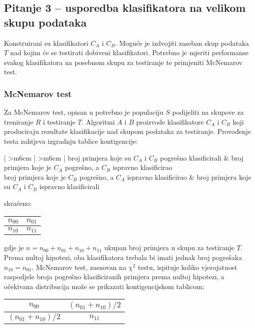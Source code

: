 \subsection{Pitanje 3 -- usporedba klasifikatora na velikom skupu podataka}
\label{subsec:pitanje3}

Konstruirani su klasifikatori $C_A$ i $C_B$. Moguće je izdvojiti zaseban skup podataka $T$ nad kojim će se testirati dobiveni klasifikatori. Potrebno je mjeriti performanse svakog klasifikatora na posebnom skupu za testiranje te primjeniti McNemarov test.

\subsubsection{McNemarov test}

Za McNemarov test, opisan u \citep{everitt1992analysis} potrebno je populaciju $S$ podijeliti na skupove za treniranje $R$ i testiranje $T$. Algoritmi $A$ i $B$ proizvode klasifikatore $C_A$ i $C_B$ koji produciraju rezultate klasifikacije nad skupom podataka za testiranje. Provođenje testa zahtjeva izgradnju tablice kontigencije:

\begin{table}[h]
\centering
\begin{tabular}{{| >{\centering\arraybackslash}m{6cm} | >{\centering\arraybackslash}m{6cm} |}}
\hline
broj primjera koje su $C_A$ i $C_B$ pogrešno klasificirali & broj primjera koje je $C_A$ pogrešno, a $C_B$ ispravno klasificirao \\ \hline
broj primjera koje je $C_B$ pogrešno, a $C_A$ ispravno klasificirao & broj primjera koje su $C_A$ i $C_B$ ispravno klasificirali \\
\hline
\end{tabular}
\end{table}
skraćeno:
\begin{table}[h]
\centering
\begin{tabular}{|c|c|}
\hline
$n_{00}$ & $n_{01}$ \\ \hline
$n_{10}$ & $n_{11}$ \\
\hline
\end{tabular}
\end{table}
gdje je $n = n_{00}+n_{01}+n_{10}+n_{11}$ ukupan broj primjera u skupu za testiranje $T$. Prema nultoj hipotezi, oba klasifikatora trebala bi imati jednak broj pogrešaka $n_{10}=n_{01}$. McNemarov test, zasnovan na $\chi^2$ testu, ispituje koliko vjerojatnost raspodjele broja pogrešno klasificiranih primjera prema nultoj hipotezi, a očekivana distribucija može se prikazati kontigencijskom tablicom:
\begin{table}[h]
\centering
\begin{tabular}{|c|c|}
\hline
$n_{00}$ & $(n_{01} + n_{10})/2$ \\ \hline
$(n_{01} + n_{10})/2$ & $n_{11}$ \\
\hline
\end{tabular}
\end{table}


